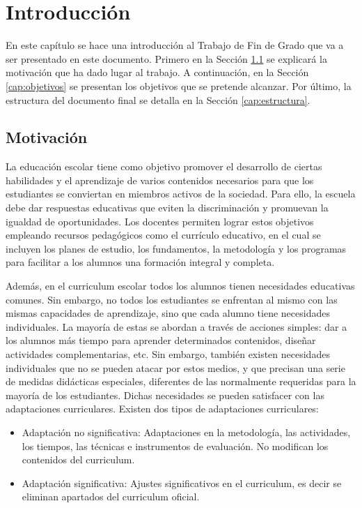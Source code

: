 \chapter{Introducción}
\label{ch:introduccion}

En este capítulo se hace una introducción al Trabajo de Fin de Grado que va a ser presentado en este documento. Primero en la Sección \ref{cap:motivacio} se explicará la motivación que ha dado lugar al trabajo. A continuación, en la Sección \ref{cap:objetivos} se presentan los objetivos que se pretende alcanzar. Por último, la estructura del documento final se detalla en la Sección \ref{cap:estructura}.

\section{Motivación}\label{cap:motivacio}
La educación escolar tiene como objetivo promover el desarrollo de ciertas habilidades y el aprendizaje de varios contenidos necesarios para que los estudiantes se conviertan en miembros activos de la sociedad. Para ello, la escuela debe dar respuestas educativas que eviten la discriminación y promuevan la igualdad de oportunidades. Los docentes permiten lograr estos objetivos empleando recursos pedagógicos como el currículo educativo, en el cual se incluyen los planes de estudio, los fundamentos, la metodología y los programas para facilitar a los alumnos una formación integral y completa.

Además, en el curriculum escolar todos los alumnos tienen necesidades educativas comunes. Sin embargo, no todos los estudiantes se enfrentan al mismo con las mismas capacidades de aprendizaje, sino que cada alumno tiene necesidades individuales. La mayoría de estas se abordan a través de acciones simples: dar a los alumnos más tiempo para aprender determinados contenidos, diseñar actividades complementarias, etc.  Sin embargo, también existen necesidades individuales que no se pueden atacar por estos medios, y que precisan una serie de medidas didácticas especiales, diferentes de las normalmente requeridas para la mayoría de los estudiantes. Dichas necesidades se pueden satisfacer con las adaptaciones curriculares. Existen dos tipos de adaptaciones curriculares:
\begin{itemize}
    \item Adaptación no significativa: Adaptaciones en la metodología, las actividades, los tiempos, las técnicas e instrumentos de evaluación. No modifican los contenidos del curriculum.  
    \item Adaptación significativa: Ajustes significativos en el curriculum, es decir se eliminan apartados del curriculum oficial. 
\end{itemize}

